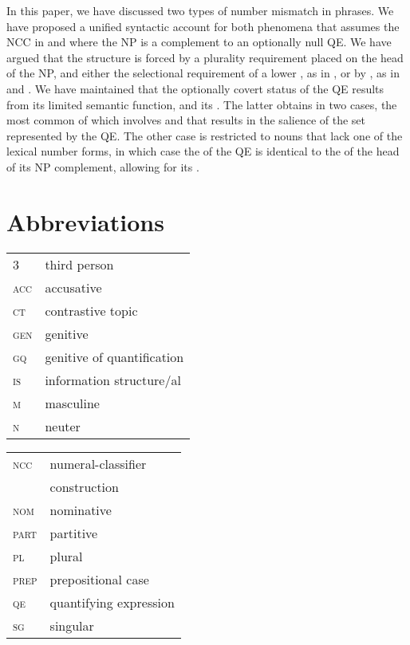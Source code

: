 \documentclass[output=paper,modfonts,newtxmath,hidelinks]{langscibook}
\begin{document}
In this paper, we have discussed two types of number  mismatch in   phrases. We have proposed a unified syntactic account for both phenomena that assumes the NCC in  and  where the  NP is a complement to an optionally null QE. We have argued that the structure is forced by a plurality requirement placed on the head of the NP, and either the selectional requirement of a lower , as in , or by , as in  and . We have maintained that the optionally covert status of the QE results from its limited semantic function, and its . The latter obtains in two cases, the most common of which involves   and   that results in the salience of the set represented by the QE. The other case is restricted to nouns that lack one of the lexical number forms, in which case the  of the QE is identical to the  of the head of its NP complement, allowing for its . 


\section*{Abbreviations}

\begin{tabularx}{.5\textwidth}{@{}lQ@{}}
\textsc{3}&third person\\
\textsc{acc}&{accusative}\\
\textsc{ct}&{contrastive} topic\\
\textsc{gen}&{genitive}\\
\textsc{gq}&{genitive} of quantification\\
\textsc{is}&{information structure}/al\\
\textsc{m}&{masculine}\\
\textsc{n}&{neuter}\\
\end{tabularx}%
\begin{tabularx}{.5\textwidth}{@{}lQ@{}}
\textsc{ncc}&numeral-classifier\\
&construction\\
\textsc{nom}&{nominative}\\
\textsc{part}&{partitive}\\
\textsc{pl}&{plural}\\
\textsc{prep}&prepositional case\\
\textsc{qe}&quantifying expression\\
\textsc{sg}&singular\\
\end{tabularx}
\end{document}
